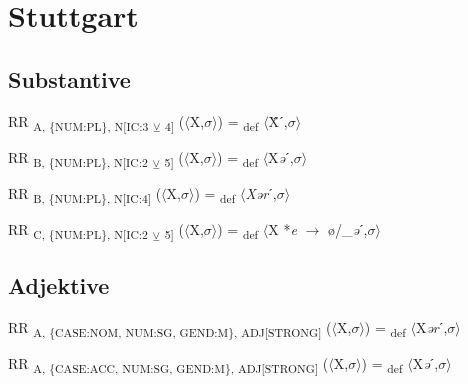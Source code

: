 {\section{Stuttgart}

\subsection{Substantive}

\begin{exe}
 RR \textsubscript{A, \{NUM:PL\}, N[IC:3} \textsubscript{${\veebar}$}\textsubscript{ 4]} ($\langle$X,$\sigma $$\rangle$) = \textsubscript{def} $\langle$Ẍˊ,$\sigma $$\rangle$
\end{exe}

\begin{exe}
 RR \textsubscript{B, \{NUM:PL\}, N[IC:2} \textsubscript{${\veebar}$}\textsubscript{ 5]} ($\langle$X,$\sigma $$\rangle$) = \textsubscript{def} $\langle$X\textit{ə}ˊ,$\sigma $$\rangle$
\end{exe}

\begin{exe}
 RR \textsubscript{B, \{NUM:PL\}, N[IC:4]} ($\langle$X,$\sigma $$\rangle$) = \textsubscript{def} $\langle$\textit{Xər}ˊ,$\sigma $$\rangle$
\end{exe}

\begin{exe}
 RR \textsubscript{C, \{NUM:PL\}, N[IC:2} \textsubscript{${\veebar}$}\textsubscript{ 5]} ($\langle$X,$\sigma $$\rangle$) = \textsubscript{def} $\langle$X *\textit{e} $\rightarrow$ ø/\_\textit{ə}ˊ,$\sigma $$\rangle$
\end{exe}

\subsection{Adjektive}

\begin{exe}
 RR \textsubscript{A, \{CASE:NOM, NUM:SG, GEND:M\}, ADJ[STRONG]} ($\langle$X,$\sigma $$\rangle$) = \textsubscript{def} $\langle$X\textit{ər}ˊ,$\sigma $$\rangle$
\end{exe}

\begin{exe}
 RR \textsubscript{A, \{CASE:ACC, NUM:SG, GEND:M\}, ADJ[STRONG]} ($\langle$X,$\sigma $$\rangle$) = \textsubscript{def} $\langle$X\textit{ə}ˊ,$\sigma $$\rangle$
\end{exe}

}
